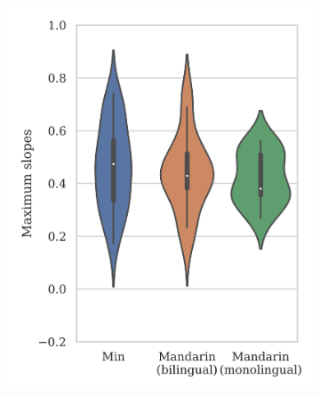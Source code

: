 \begin{figure}[hbt!]
\centering
\begin{subfigure}[b]{.49\textwidth}
\centering
\includegraphics[width=\textwidth]{figures/E3/Result_51.png}
\end{subfigure}
\hfill
\begin{subfigure}[b]{.49\textwidth}
\centering

\end{subfigure}
\end{figure}
